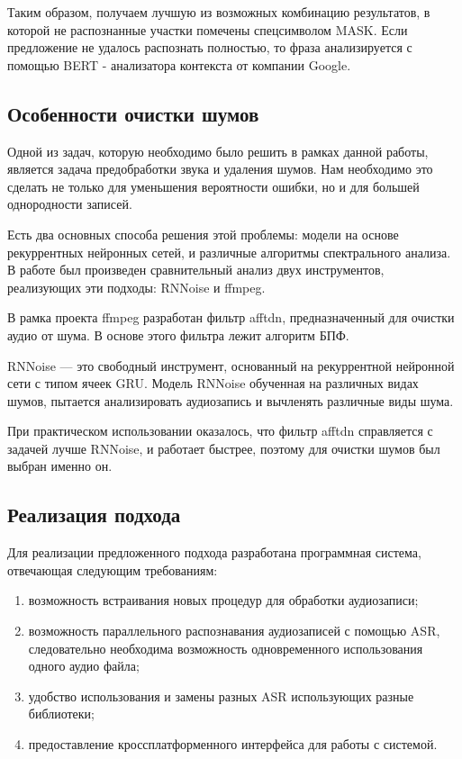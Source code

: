 \documentclass[conference]{IEEEtran}
\begin{document}
Таким образом, получаем лучшую из возможных комбинацию результатов, в которой не распознанные участки помечены спецсимволом MASK. Если предложение не удалось распознать полностью, то фраза анализируется с помощью BERT - анализатора контекста от компании Google.

\subsection{Особенности очистки шумов}
Одной из задач, которую необходимо было решить в рамках данной работы, является задача предобработки звука и удаления шумов. Нам необходимо это сделать не только для уменьшения вероятности ошибки, но и для большей однородности записей.

Есть два основных способа решения этой проблемы: модели на основе рекуррентных нейронных сетей, и различные алгоритмы спектрального анализа.
В работе был произведен сравнительный анализ двух инструментов, реализующих эти подходы: RNNoise и ffmpeg.

В рамка проекта ffmpeg разработан фильтр afftdn, предназначенный для очистки аудио от шума. В основе этого фильтра лежит алгоритм БПФ.

RNNoise — это свободный инструмент, основанный на рекуррентной нейронной сети с типом ячеек GRU. Модель RNNoise обученная на различных видах шумов, пытается анализировать аудиозапись и вычленять различные виды шума.

При практическом использовании оказалось, что фильтр afftdn справляется с задачей лучше RNNoise, и работает быстрее, поэтому для очистки шумов был выбран именно он.

\subsection{Реализация подхода}

Для реализации предложенного подхода разработана программная система, отвечающая следующим требованиям:

\begin{enumerate}
\item возможность встраивания новых процедур для обработки аудиозаписи;
\item возможность параллельного распознавания аудиозаписей с помощью ASR, следовательно необходима возможность одновременного использования одного аудио файла;
\item удобство использования и замены разных ASR использующих разные библиотеки;
\item предоставление кроссплатформенного интерфейса для работы с системой.
\end{enumerate}
\end{document}

